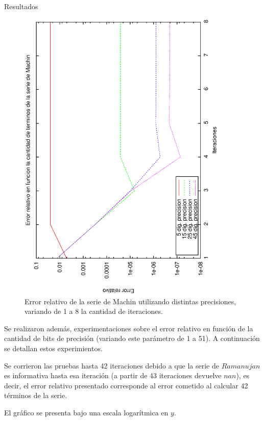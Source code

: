 \begin{section}{Resultados}
	\VSP	
	\begin{figure}[H]
	  \centering
		\includegraphics[width=10cm,angle=-90]{graficos/machin_1a8it.eps}
	  \caption{Error relativo de la serie de Machin utilizando distintas precisiones, variando de 1 a 8 la cantidad de iteraciones.}
	  \label{fig:machin_10it}
	\end{figure}
	
	\VSP	

	Se realizaron además, experimentaciones sobre el error relativo en función de la cantidad de bits de precisión (variando este parámetro de 1 a 51). A continuación se detallan estos experimientos.
	
	Se corrieron las pruebas hasta 42 iteraciones debido a que la serie de $Ramanujan$ es informativa hasta esa iteración (a partir de 43 iteraciones devuelve $nan$), es decir, el error relativo presentado corresponde al error cometido al calcular 42 términos de la serie.
	
	El gráfico se presenta bajo una escala logarítmica en $y$.
	

\end{section}
